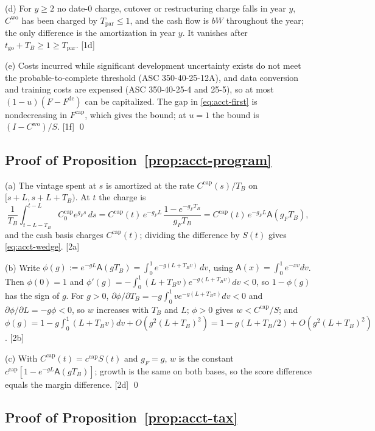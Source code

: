 (d) For $y\ge 2$ no date-0 charge, cutover or restructuring charge falls in year $y$, $C^{\mathrm{wo}}$ has been charged by $T_{\mathrm{par}}\le 1$, and the cash flow is $bW$ throughout the year; the only difference is the amortization in year $y$. It vanishes after $t_{\mathrm{go}}+T_B\ge 1\ge T_{\mathrm{par}}$. [1d]

(e) Costs incurred while significant development uncertainty exists do not meet the probable-to-complete threshold (ASC 350-40-25-12A), and data conversion and training costs are expensed (ASC 350-40-25-4 and 25-5), so at most $(1-u)(F-F^{\mathrm{dc}})$ can be capitalized. The gap in \eqref{eq:acct-first} is nondecreasing in $F^{\mathrm{cap}}$, which gives the bound; at $u=1$ the bound is $(I-C^{\mathrm{wo}})/S$. [1f] \qed

\subsection*{Proof of Proposition~\ref{prop:acct-program}}

(a) The vintage spent at $s$ is amortized at the rate $C^{\mathrm{cap}}(s)/T_B$ on $[s+L,s+L+T_B)$. At $t$ the charge is
\[
\frac1{T_B}\int_{t-L-T_B}^{t-L}C^{\mathrm{cap}}_0e^{g_Fs}\,ds=C^{\mathrm{cap}}(t)\,e^{-g_FL}\,\frac{1-e^{-g_FT_B}}{g_FT_B}=C^{\mathrm{cap}}(t)\,e^{-g_FL}\mathsf A(g_FT_B),
\]
and the cash basis charges $C^{\mathrm{cap}}(t)$; dividing the difference by $S(t)$ gives \eqref{eq:acct-wedge}. [2a]

(b) Write $\phi(g):=e^{-gL}\mathsf A(gT_B)=\int_0^1e^{-g(L+T_Bv)}\,dv$, using $\mathsf A(x)=\int_0^1e^{-xv}dv$. Then $\phi(0)=1$ and $\phi'(g)=-\int_0^1(L+T_Bv)e^{-g(L+T_Bv)}dv<0$, so $1-\phi(g)$ has the sign of $g$. For $g>0$, $\partial\phi/\partial T_B=-g\int_0^1ve^{-g(L+T_Bv)}dv<0$ and $\partial\phi/\partial L=-g\phi<0$, so $w$ increases with $T_B$ and $L$; $\phi>0$ gives $w<C^{\mathrm{cap}}/S$; and $\phi(g)=1-g\int_0^1(L+T_Bv)dv+O(g^2(L+T_B)^2)=1-g(L+T_B/2)+O(g^2(L+T_B)^2)$. [2b]

(c) With $C^{\mathrm{cap}}(t)=c^{\mathrm{cap}}S(t)$ and $g_F=g$, $w$ is the constant $c^{\mathrm{cap}}[1-e^{-gL}\mathsf A(gT_B)]$; growth is the same on both bases, so the score difference equals the margin difference. [2d] \qed

\subsection*{Proof of Proposition~\ref{prop:acct-tax}}

